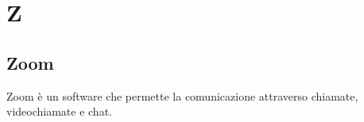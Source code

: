 \section{Z}

\subsection{Zoom}
Zoom è un software che permette la comunicazione attraverso chiamate, videochiamate e chat. 
\clearpage